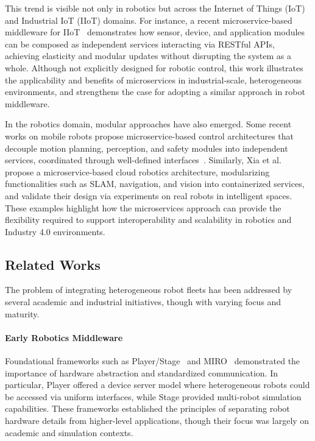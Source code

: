 \documentclass[conference]{IEEEtran}
\begin{document}
This trend is visible not only in robotics 
 but across the Internet of Things (IoT) and Industrial IoT (IIoT) domains. 
% 
For instance, a recent microservice-based middleware for IIoT~\cite{venanzi2021globecom} demonstrates how 
 sensor, device, and application modules can be composed as independent services interacting via RESTful APIs, 
  achieving elasticity and modular updates without disrupting the system as a whole. 
%  
Although not explicitly designed for robotic control, 
 this work illustrates the applicability and benefits of microservices in 
  industrial-scale, heterogeneous environments, and strengthens the case 
  for adopting a similar approach in robot middleware.

In the robotics domain, modular approaches have also emerged. 
%
Some recent works on mobile robots propose microservice-based control architectures 
 that decouple motion planning, perception, and safety modules into independent services, 
 coordinated through well-defined interfaces~\cite{DBLP:journals/ras/SchrickHTK25}. 
% 
Similarly, Xia et al.~\cite{DBLP:journals/ras/XiaZWCL18} propose a microservice-based cloud robotics architecture, 
 modularizing functionalities such as SLAM, navigation, and vision into containerized services,
 and validate their design via experiments on real robots in intelligent spaces.
% 
These examples highlight how the microservices approach can provide the flexibility required 
 to support interoperability and scalability in robotics and Industry 4.0 environments.

\subsection{Related Works}
The problem of integrating heterogeneous robot fleets has been addressed 
 by several academic and industrial initiatives, though with varying focus and maturity.

\paragraph{Early Robotics Middleware} 
Foundational frameworks such as Player/Stage~\cite{vaughan2003player} 
 and MIRO~\cite{DBLP:journals/trob/UtzSEK02} demonstrated the importance 
 of hardware abstraction and standardized communication. 
% 
In particular, Player offered a device server model where heterogeneous robots could be accessed via uniform interfaces, 
 while Stage provided multi-robot simulation capabilities. 
% 
These frameworks established the principles of separating robot hardware details from higher-level applications, 
 though their focus was largely on academic and simulation contexts.
\end{document}
